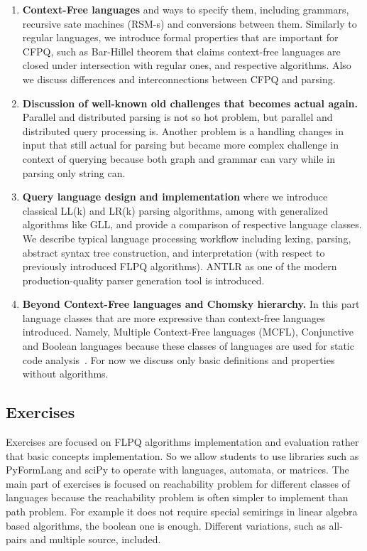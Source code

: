\documentclass[sigconf]{acmart}
\begin{document}
\begin{enumerate}
  \item \label{cf_languages_intro} \textbf{Context-Free languages} and ways to specify them, including grammars, recursive sate machines (RSM-s) and conversions between them.
  Similarly to regular languages, we introduce formal properties that are important for CFPQ, such as Bar-Hillel theorem that claims context-free languages are closed under intersection with regular ones, and respective algorithms.
  Also we discuss differences and interconnections between CFPQ and parsing.
  
  \item \label{new_old_problems_discussion} \textbf{Discussion of well-known old challenges that becomes actual again.} 
  Parallel and distributed parsing is not so hot problem, but parallel and distributed query processing is. 
  Another problem is a handling changes in input that still actual for parsing but became more complex challenge in context of querying because both graph and grammar can vary while in parsing only string can.
  
  \item \label{parsing_techniques} \textbf{Query language design and implementation}
  where we introduce classical LL(k) and LR(k) parsing algorithms, among with generalized algorithms like GLL, and provide a comparison of respective language classes.
  We describe typical language processing workflow including lexing, parsing, abstract syntax tree construction, and interpretation (with respect to previously introduced FLPQ algorithms).
  ANTLR as one of the modern production-quality parser generation tool is introduced.
  
  \item \label{beyond_chomsky_hierarchy} \textbf{Beyond Context-Free languages and Chomsky hierarchy.}
  In this part language classes that are more expressive than context-free languages introduced. 
  Namely, Multiple Context-Free languages (MCFL), Conjunctive and Boolean languages because these classes of languages are used for static code analysis~\cite{10.1145/3009837.3009848, 10.1145/3704854}. 
  For now we discuss only basic definitions and properties without algorithms. 
\end{enumerate}


\subsection{Exercises}

Exercises are focused on FLPQ algorithms implementation and evaluation rather that basic concepts implementation.
So we allow students to use libraries such as PyFormLang and sciPy to operate with languages, automata, or matrices.
The main part of exercises is focused on reachability problem for different classes of languages because the reachability problem is often simpler to implement than path problem.
For example it does not require special semirings in linear algebra based algorithms, the boolean one is enough.  
Different variations, such as all-pairs and multiple source, included.
\end{document}
